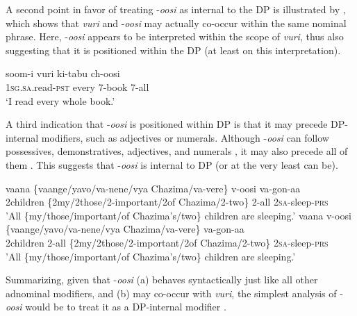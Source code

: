 \documentclass[output=paper]{langsci/langscibook}
\begin{document}
A second point in favor of treating -\textit{oosi} as internal to the DP is illustrated by , which shows that \textit{vuri} and -\textit{oosi} may actually co-occur within the same nominal phrase. Here, -\textit{oosi} appears to be interpreted within the scope of \textit{vuri}, thus also suggesting that it is positioned within the DP (at least on this interpretation).

\ea\label{ex:landman:24}
\gll soom-i      vuri    ki-tabu  ch-oosi\\
     1\textsc{sg.sa}.read-\textsc{pst}  every    7-book  7-all \\
\glt ‘I read every whole book.’
\z

A third indication that -\textit{oosi} is positioned within DP is that it may precede DP-internal modifiers, such as adjectives or numerals. Although -\textit{oosi} can follow possessives, demonstratives, adjectives, and numerals , it may also precede all of them . This suggests that -\textit{oosi} is internal to DP (or at the very least can be). 

\ea\label{ex:landman:25} 
\ea\label{ex:landman:25a} 
\gll vaana  \textup{\{}vaange\textup{/}yavo\textup{/}va-nene/vya Chazima/va-vere\}  v-oosi  va-gon-aa\\
     2children  \{2my/2those/2-important/2of Chazima/2-two\}  2-all  2\textsc{sa}-sleep-\textsc{prs}\\
\glt 'All \{my/those/important/of Chazima's/two\} children are sleeping.'  
\ex\label{ex:landman:25b}
\gll vaana  v-oosi\textup{   \{}vaange\textup{/}yavo\textup{/}va-nene/vya Chazima/va-vere\}  va-gon-aa\\
     2children  2-all   \{2my/2those/2-important/2of Chazima/2-two\}  2\textsc{sa}-sleep-\textsc{prs}\\
\glt     'All \{my/those/important/of Chazima's/two\} children are sleeping.'  \\
\z
\z

  Summarizing, given that -\textit{oosi} (a) behaves syntactically just like all other adnominal modifiers, and (b) may co-occur with \textit{vuri}, the simplest analysis of -\textit{oosi} would be to treat it as a DP-internal modifier .
\end{document}
